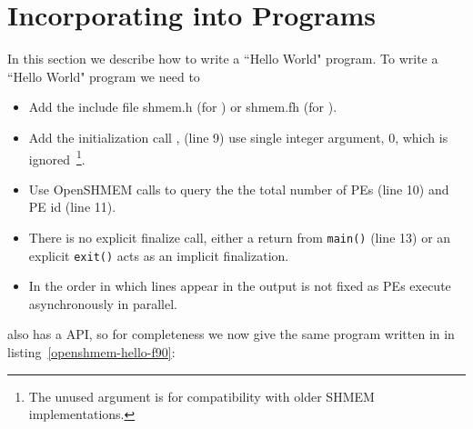 \section*{Incorporating \openshmem{} into Programs}

In this section we describe how to write a ``Hello World" \openshmem program.
To write a ``Hello World" \openshmem program we need to 

\begin{itemize}
\item Add the include file shmem.h (for \Clang) or shmem.fh (for \Fortran).
\item Add the initialization call , (line 9) use
  single integer argument, 0, which is ignored~\footnote{The unused
    argument is for compatibility with older SHMEM implementations.}.
\item Use OpenSHMEM calls to query the the total number of PEs (line 10) and PE id (line 11).
\item There is no explicit finalize call, either a return from
  \texttt{main()} (line 13) or an explicit \texttt{exit()} acts as an
  implicit \openshmem finalization.
\item In \openshmem the order in which lines appear
  in the output is not fixed as \ac{PE}s execute asynchronously in parallel.
\end{itemize}

\begin{minipage}{\linewidth}
\vspace{0.1in}
\vspace{0.1in}
\end{minipage}

\openshmem also has a \Fortran{} API, so for completeness we now give the
same program written in \Fortran{} in listing~\ref{openshmem-hello-f90}:

\begin{minipage}{\linewidth}
\vspace{0.1in}
\vspace{0.1in}
\end{minipage}

